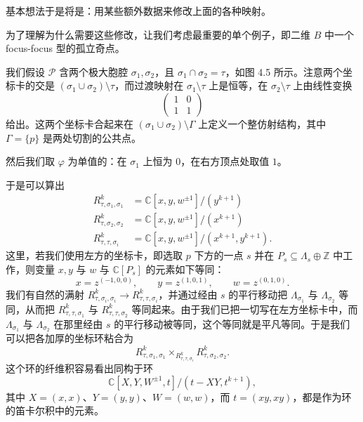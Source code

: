 基本想法于是将是：用某些额外数据来修改上面的各种映射。

为了理解为什么需要这些修改，让我们考虑最重要的单个例子，即二维 $B$ 中一个 focus-focus 型的孤立奇点。

我们假设 $\mathcal{P}$ 含两个极大胞腔 $\sigma_1,\sigma_2$，且 $\sigma_1\cap\sigma_2=\tau$，如图 4.5 所示。注意两个坐标卡的交是 $(\sigma_1\cup\sigma_2)\setminus\tau$，而过渡映射在 $\sigma_1\setminus\tau$ 上是恒等，在 $\sigma_2\setminus\tau$ 上由线性变换
\[
\begin{pmatrix} 1 & 0 \\ 1 & 1 \end{pmatrix}
\]
给出。这两个坐标卡合起来在 $(\sigma_1\cup\sigma_2)\setminus\Gamma$ 上定义一个整仿射结构，其中 $\Gamma=\{p\}$ 是两处切割的公共点。

然后我们取 $\varphi$ 为单值的：在 $\sigma_1$ 上恒为 $0$，在右方顶点处取值 $1$。

于是可以算出
\[
\begin{aligned}
R_{\tau,\sigma_1,\sigma_1}^k&=\mathbb{C}[x,y,w^{\pm1}]/(y^{k+1})\\
R_{\tau,\sigma_2,\sigma_2}^k&=\mathbb{C}[x,y,w^{\pm1}]/(x^{k+1})\\
R_{\tau,\tau,\sigma_i}^k&=\mathbb{C}[x,y,w^{\pm1}]/(x^{k+1},y^{k+1}).
\end{aligned}
\]
这里，若我们使用左方的坐标卡，即选取 $p$ 下方的一点 $s$ 并在 $P_s\subseteq\Lambda_s\oplus\mathbb{Z}$ 中工作，则变量 $x,y$ 与 $w$ 与 $\mathbb{C}[P_s]$ 的元素如下等同：
\[
x=z^{(-1,0,0)},\qquad y=z^{(1,0,1)},\qquad w=z^{(0,1,0)}.
\]
我们有自然的满射 $R_{\tau,\sigma_i,\sigma_i}^k\to R_{\tau,\tau,\sigma_i}^k$，并通过经由 $s$ 的平行移动把 $\Lambda_{\sigma_1}$ 与 $\Lambda_{\sigma_2}$ 等同，从而把 $R_{\tau,\tau,\sigma_1}^k$ 与 $R_{\tau,\tau,\sigma_2}^k$ 等同起来。由于我们已把一切写在左方坐标卡中，而 $\Lambda_{\sigma_1}$ 与 $\Lambda_{\sigma_2}$ 在那里经由 $s$ 的平行移动被等同，这个等同就是平凡等同。于是我们可以把各加厚的坐标环粘合为
\[
R_{\tau,\sigma_1,\sigma_1}^k\times_{R_{\tau,\tau,\sigma_i}^k}R_{\tau,\sigma_2,\sigma_2}^k.
\]
这个环的纤维积容易看出同构于环
\[
\mathbb{C}[X,Y,W^{\pm1},t]/(t-XY,t^{k+1}),
\]
其中 $X=(x,x)$、$Y=(y,y)$、$W=(w,w)$，而 $t=(xy,xy)$，都是作为环的笛卡尔积中的元素。

